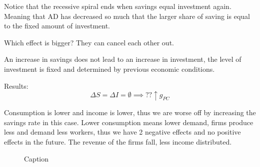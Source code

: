 \documentclass{report}
\begin{document}
Notice that the recessive spiral ends when savings equal investment again. Meaning that AD has decreased so much that the larger share of saving is equal to the fixed amount of investment. 

Which effect is bigger? They can cancel each other out.

An increase in savings does not lead to an increase in investment, the level of investment is fixed and determined by previous economic conditions. 

Results:
$$\Delta S = \Delta I = \emptyset \implies ?? \uparrow g_{PC}$$


Consumption is lower and income is lower, thus we are worse off by increasing the savings rate in this case. Lower consumption means lower demand, firms produce less and demand less workers, thus we have 2 negative effects and no positive effects in the future. The revenue of the firms fall, less income distributed. 


\begin{figure}[H]
    \centering
    \caption{Caption}
\end{figure}
\end{document}

